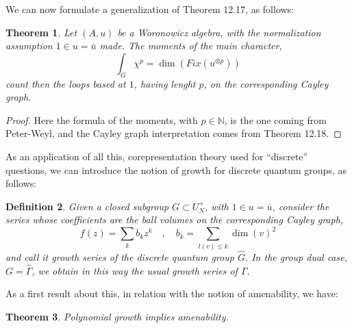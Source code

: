 \documentclass[12pt]{amsbook}
\newtheorem{theorem}{Theorem}[chapter]
\newtheorem{definition}[theorem]{Definition}
\begin{document}
We can now formulate a generalization of Theorem 12.17, as follows:

\begin{theorem}
Let $(A,u)$ be a Woronowicz algebra, with the normalization assumption $1\in u=\bar{u}$ made. The moments of the main character, 
$$\int_G\chi^p=\dim\left(Fix(u^{\otimes p})\right)$$
count then the loops based at $1$, having lenght $p$, on the corresponding Cayley graph.
\end{theorem}

\begin{proof}
Here the formula of the moments, with $p\in\mathbb N$, is the one coming from Peter-Weyl, and the Cayley graph interpretation comes from Theorem 12.18.
\end{proof}

As an application of all this, corepresentation theory used for ``discrete'' questions, we can introduce the notion of growth for discrete quantum groups, as follows:

\begin{definition}
Given a closed subgroup $G\subset U_N^+$, with $1\in u=\bar{u}$, consider the series  whose coefficients are the ball volumes on the corresponding Cayley graph,
$$f(z)=\sum_kb_kz^k\quad,\quad 
b_k=\sum_{l(v)\leq k}\dim(v)^2$$
and call it growth series of the discrete quantum group $\widehat{G}$. In the group dual case, $G=\widehat{\Gamma}$, we obtain in this way the usual growth series of $\Gamma$. 
\end{definition}

As a first result about this, in relation with the notion of amenability, we have:

\begin{theorem}
Polynomial growth implies amenability.
\end{theorem}
\end{document}

